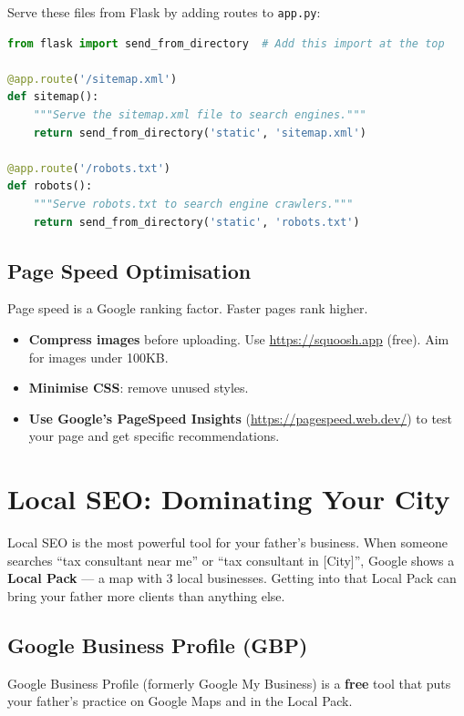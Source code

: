\documentclass[12pt, a4paper]{book}
\begin{document}
Serve these files from Flask by adding routes to \texttt{app.py}:

\begin{lstlisting}[language=Python, style=pythonstyle, caption={Add sitemap and robots.txt routes to app.py}]
from flask import send_from_directory  # Add this import at the top

@app.route('/sitemap.xml')
def sitemap():
    """Serve the sitemap.xml file to search engines."""
    return send_from_directory('static', 'sitemap.xml')

@app.route('/robots.txt')
def robots():
    """Serve robots.txt to search engine crawlers."""
    return send_from_directory('static', 'robots.txt')
\end{lstlisting}

\subsection{Page Speed Optimisation}

Page speed is a Google ranking factor. Faster pages rank higher.

\begin{itemize}[leftmargin=1.5em]
  \item \textbf{Compress images} before uploading. Use \url{https://squoosh.app} (free).
        Aim for images under 100KB.
  \item \textbf{Minimise CSS}: remove unused styles.
  \item \textbf{Use Google's PageSpeed Insights} (\url{https://pagespeed.web.dev/})
        to test your page and get specific recommendations.
\end{itemize}

\section{Local SEO: Dominating Your City}

Local SEO is the most powerful tool for your father's business.
When someone searches ``tax consultant near me'' or ``tax consultant in [City]'',
Google shows a \textbf{Local Pack} --- a map with 3 local businesses.
Getting into that Local Pack can bring your father more clients than anything else.

\subsection{Google Business Profile (GBP)}

Google Business Profile (formerly Google My Business) is a \textbf{free} tool
that puts your father's practice on Google Maps and in the Local Pack.
\end{document}
